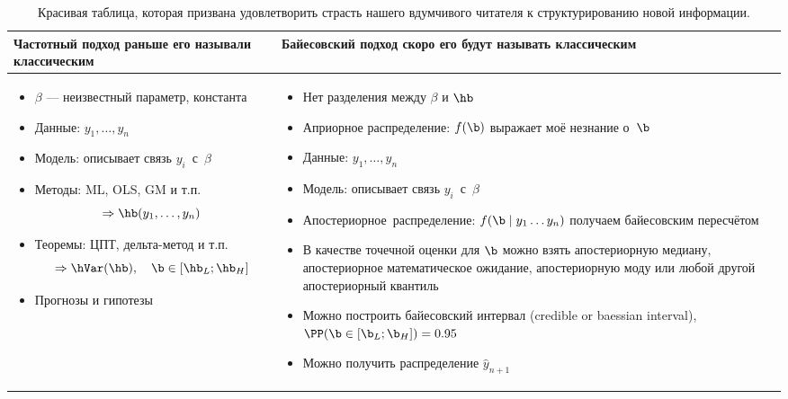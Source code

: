 \begin{table}
\begin{tabularx}{\textwidth}{L|L}
\hline
{\large Частотный подход} \newline раньше его называли классическим  & {\large Байесовский подход} \newline скоро его будут называть классическим  \\
\hline
\begin{itemize}
\item $\beta$ --- неизвестный параметр, константа
\item Данные: $y_1, \ldots, y_n$
\item Модель: описывает связь $y_i$~с~$\beta$
\item Методы: ML, OLS, GM и т.п. \[\Rightarrow \hb(y_1,\ldots,y_n)\]
\item Теоремы: ЦПТ, дельта-метод и т.п.  \[\Rightarrow \hVar(\hb), \quad \b \in [\hb_L; \hb_H]\]
\item Прогнозы и гипотезы
\end{itemize}

&  %

\begin{itemize}
\item Нет разделения между $\beta$ и $\hb$
\item Априорное распределение: $ f( \b )$ выражает моё незнание о~$\b$
\item Данные: $y_1, \ldots, y_n$
\item Модель: описывает связь $y_i$~с~$\beta$
\item Апостериорное~распределение:  $f( \b \mid y_1 \ldots y_n )$ получаем байесовским пересчётом
\item В качестве точечной оценки для $\b$ можно взять апостериорную медиану, апостериорное математическое ожидание, апостериорную моду или любой другой апостериорный квантиль
\item Можно построить байесовский интервал (credible or baessian interval), $\PP( \b \in [\b_L ; \b_H]) = 0.95 $
\item Можно получить распределение $\hat y_{n+1}$
\end{itemize}

\\
\end{tabularx}
\caption{Красивая таблица, которая призвана удовлетворить страсть нашего вдумчивого читателя к структурированию новой информации.} \label{bayes_table}
\end{table}

